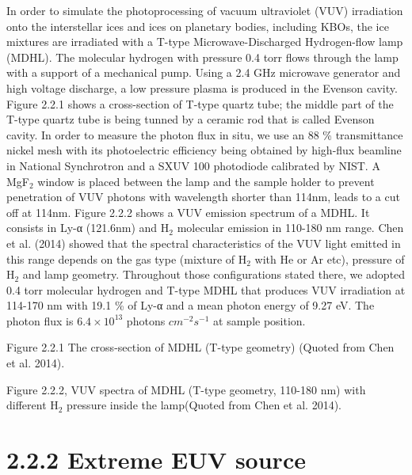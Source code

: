 In order to simulate the photoprocessing of vacuum ultraviolet (VUV) irradiation onto the interstellar ices and ices on planetary bodies, including KBOs, the ice mixtures are irradiated with a T-type Microwave-Discharged Hydrogen-flow lamp (MDHL). The molecular hydrogen with pressure 0.4 torr flows through the lamp with a support of a mechanical pump. Using a 2.4 GHz microwave generator and high voltage discharge, a low pressure plasma is produced in the Evenson cavity. Figure 2.2.1 shows a cross-section of T-type quartz tube; the middle part of the T-type quartz tube is being tunned by a ceramic rod that is called Evenson cavity.  In order to measure the photon flux in situ, we use an 88 \% transmittance nickel mesh with its photoelectric efficiency being obtained by high-flux beamline in National Synchrotron and a SXUV 100 photodiode calibrated by NIST. A MgF$_2$ window is placed between the lamp and the sample holder to prevent penetration of VUV photons with wavelength shorter than 114nm, leads to a cut off at 114nm. Figure 2.2.2 shows a VUV emission spectrum of a MDHL. It consists in Ly-α (121.6nm) and H$_2$ molecular emission in 110-180 nm range. Chen et al. (2014) showed that the spectral characteristics of the VUV light emitted in this range depends on the gas type (mixture of H$_2$ with He or Ar etc), pressure of H$_2$ and lamp geometry. Throughout those configurations stated there, we adopted 0.4 torr molecular hydrogen and T-type MDHL that produces VUV irradiation at 114-170 nm with 19.1 \% of Ly-α and a mean photon energy of 9.27 eV. The photon flux is $6.4 \times 10^{13}$ photons $cm^{-2} s^{-1}$ at sample position.


Figure 2.2.1 The cross-section of MDHL (T-type geometry) (Quoted from Chen et al. 2014).




Figure 2.2.2, VUV spectra of MDHL (T-type geometry, 110-180 nm) with different H$_2$ pressure inside the lamp(Quoted from Chen et al. 2014).


\section{2.2.2 Extreme EUV source}

